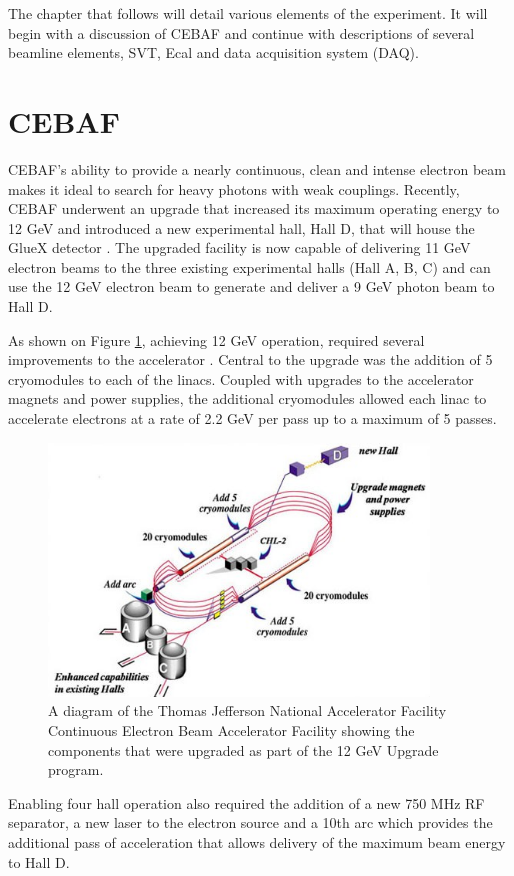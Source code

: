 The chapter that follows will detail various elements of the experiment.
It will begin with a discussion of CEBAF and continue with descriptions
of several beamline elements, SVT, Ecal and data acquisition system (DAQ).

\section{CEBAF}

CEBAF's ability to provide a nearly continuous, clean and intense electron
beam makes it ideal to search for heavy photons with weak couplings. Recently,
CEBAF underwent an upgrade that increased its maximum operating energy to 12
GeV and introduced a new experimental hall, Hall D, that will house the
GlueX detector \cite{Dudek:2012vr}.  The upgraded facility is now capable of 
delivering 11 GeV electron beams to the three existing experimental halls
(Hall A, B, C) and can use the 12 GeV electron beam to generate and deliver a 9
GeV photon beam to Hall D. 

As shown on Figure \ref{fig:cebaf}, achieving 12 GeV operation, required several
improvements to the accelerator \cite{Burkert:2012rh}. Central to the upgrade 
was the addition of 5 
cryomodules to each of the linacs.  Coupled with upgrades to the accelerator
magnets and power supplies, the additional cryomodules allowed each linac to
accelerate electrons at a rate of 2.2 GeV per pass up to a maximum of 5 passes.
\begin{figure}[h]
    \centering
    \includegraphics[width=0.9\textwidth]{images/cebaf.jpg}
    \caption{A diagram of the Thomas Jefferson National Accelerator Facility
             Continuous Electron Beam Accelerator Facility showing the 
             components that were upgraded as part of the 12 GeV Upgrade 
             program.}
    \label{fig:cebaf}
\end{figure}
Enabling four hall operation also required the addition of a new 750 MHz RF 
separator, a new laser to the electron source and a 10th arc which provides
the additional pass of acceleration that allows 
delivery of the maximum beam energy to Hall D.


